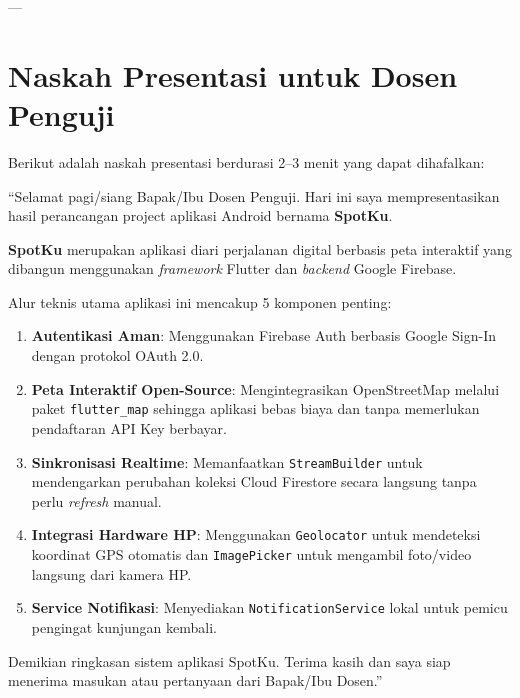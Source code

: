 \documentclass[12pt,a4paper]{article}
\begin{document}
---

\section{Naskah Presentasi untuk Dosen Penguji}

Berikut adalah naskah presentasi berdurasi 2--3 menit yang dapat dihafalkan:

\begin{tcolorbox}[colback=teal!5,colframe=teal!60,title=Naskah Presentasi Mahasiswa]
``Selamat pagi/siang Bapak/Ibu Dosen Penguji. Hari ini saya mempresentasikan hasil perancangan project aplikasi Android bernama \textbf{SpotKu}.

\textbf{SpotKu} merupakan aplikasi diari perjalanan digital berbasis peta interaktif yang dibangun menggunakan \textit{framework} Flutter dan \textit{backend} Google Firebase.

Alur teknis utama aplikasi ini mencakup 5 komponen penting:
\begin{enumerate}
    \item \textbf{Autentikasi Aman}: Menggunakan Firebase Auth berbasis Google Sign-In dengan protokol OAuth 2.0.
    \item \textbf{Peta Interaktif Open-Source}: Mengintegrasikan OpenStreetMap melalui paket \texttt{flutter\_map} sehingga aplikasi bebas biaya dan tanpa memerlukan pendaftaran API Key berbayar.
    \item \textbf{Sinkronisasi Realtime}: Memanfaatkan \texttt{StreamBuilder} untuk mendengarkan perubahan koleksi Cloud Firestore secara langsung tanpa perlu \textit{refresh} manual.
    \item \textbf{Integrasi Hardware HP}: Menggunakan \texttt{Geolocator} untuk mendeteksi koordinat GPS otomatis dan \texttt{ImagePicker} untuk mengambil foto/video langsung dari kamera HP.
    \item \textbf{Service Notifikasi}: Menyediakan \texttt{NotificationService} lokal untuk pemicu pengingat kunjungan kembali.
\end{enumerate}

Demikian ringkasan sistem aplikasi SpotKu. Terima kasih dan saya siap menerima masukan atau pertanyaan dari Bapak/Ibu Dosen.''
\end{tcolorbox}
\end{document}
